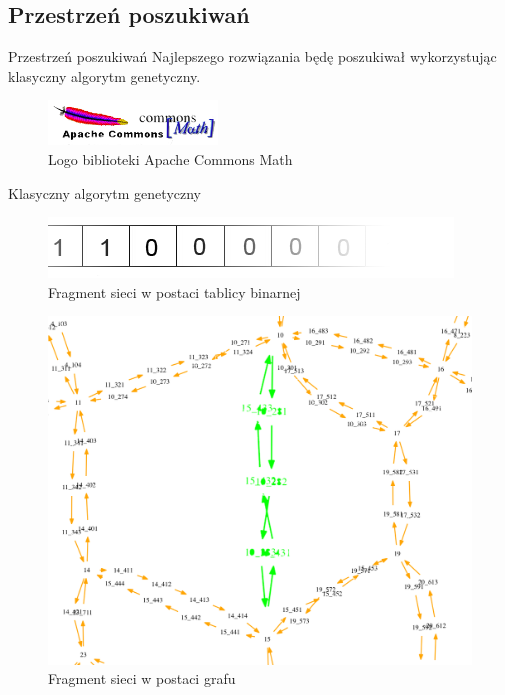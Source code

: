 \documentclass{beamer}
\begin{document}
\subsection{Przestrzeń poszukiwań}
\begin{frame}{Przestrzeń poszukiwań} 
Najlepszego rozwiązania będę poszukiwał wykorzystując klasyczny algorytm genetyczny.

	\begin{figure}[b]
	\includegraphics[width=0.40\textwidth]{img/math}
	\caption{Logo biblioteki Apache Commons Math \cite{math}} 
	\end{figure}

\end{frame}

\begin{frame}{Klasyczny algorytm genetyczny} 

\centering
\begin{minipage}[b]{.48\textwidth}
\begin{figure}[]
\includegraphics[width=\textwidth]{img/bool}
\caption{Fragment sieci w postaci tablicy binarnej }
\end{figure}
\end{minipage}\hfill
\begin{minipage}[b]{.48\textwidth}
\begin{figure}[]
\includegraphics[width=\textwidth]{img/bool-efect}
\caption{Fragment sieci w postaci grafu}
\end{figure}
\end{minipage}\hfill

\end{frame}
\end{document}
